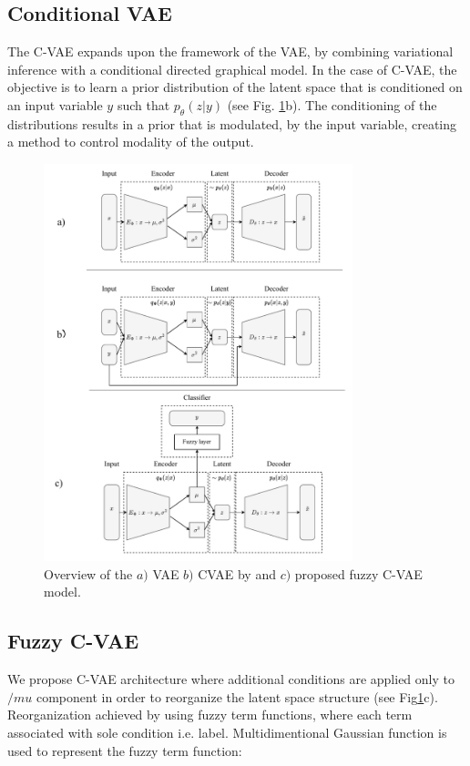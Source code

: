 \documentclass[runningheads]{llncs}
\begin{document}
\subsection{Conditional VAE}
The C-VAE expands upon the framework of the VAE, by combining variational inference with a conditional directed graphical model. 
In the case of C-VAE, the objective is to learn a prior distribution of the latent space that is conditioned on an input variable $y$ such that $p_\theta (z|y)$ (see Fig. \ref{fig:overview}b).
The conditioning of the distributions results in a prior that is modulated, by the input variable, creating a method to control modality of the output. 

\begin{figure}[h]  
    \centering
    \includegraphics[width=0.8\textwidth]{fig_1.pdf}
    \caption{Overview of the $a)$ VAE $b)$ CVAE by \cite{SohnCVAE} and $c)$ proposed fuzzy C-VAE model.}
    \label{fig:overview}
\end{figure}

\subsection{Fuzzy C-VAE}

We propose C-VAE architecture where additional conditions are applied only to $/mu$ component in order to reorganize the latent space structure (see Fig\ref{fig:overview}c).
Reorganization achieved by using fuzzy term functions, where each term associated with sole condition i.e. label.
Multidimentional Gaussian function is used to represent the fuzzy term function:
\end{document}
